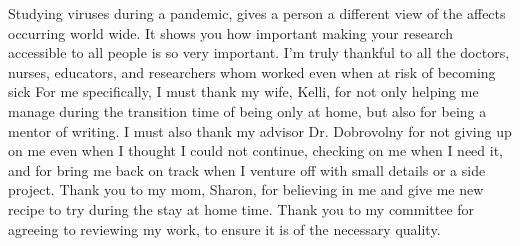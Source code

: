 Studying viruses during a pandemic, gives a person a different view of the affects occurring world wide. It shows you how important making your research accessible to all people is so very important. I'm truly thankful to all the doctors, nurses, educators, and researchers whom worked even when at risk of becoming sick
For me specifically, I must thank my wife, Kelli, for not only helping me manage during the transition time of being only at home, but also for being a mentor of writing. I must also thank my advisor Dr. Dobrovolny for not giving up on me even when I thought I could not continue, checking on me when I need it, and for bring me back on track when I venture off with small details or a side project. 
Thank you to my mom, Sharon, for believing in me and give me new recipe to try during the stay at home time.
Thank you to my committee for agreeing to reviewing my work, to ensure it is of the necessary quality.
